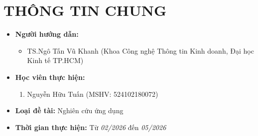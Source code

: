 \documentclass{article}[12pt]
\begin{document}
    \section{THÔNG TIN CHUNG}
    \begin{itemize}[label = {}]
        
        \item \textbf{Người hướng dẫn:} 
        \begin{itemize}
            \item TS.Ngô Tấn Vũ Khanh (Khoa Công nghệ Thông tin Kinh doanh, Đại học Kinh tế TP.HCM)
        \end{itemize}{}
    
        
        \item \textbf{Học viên thực hiện:}
        
        \begin{enumerate}
        
            \item Nguyễn Hữu Tuấn (MSHV: 524102180072) 
        \end{enumerate}

        \item \textbf{Loại đề tài:} Nghiên cứu ứng dụng
        
        \item \textbf{Thời gian thực hiện:} Từ \textit{02/2026} đến \textit{05/2026}
        
        
    \end{itemize}
    
    \pagebreak 
    
\end{document}
